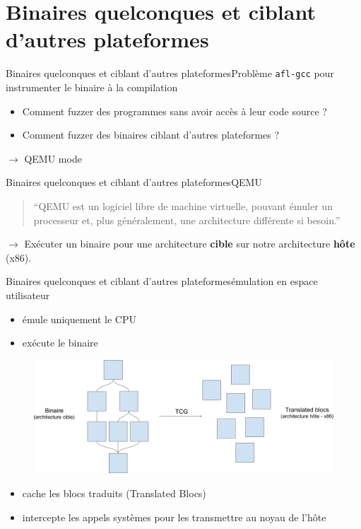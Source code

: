 \section{Binaires quelconques et ciblant d'autres plateformes}

\begin{frame}{Binaires quelconques et ciblant d'autres plateformes}{Problème}
  \lstinline{afl-gcc} pour instrumenter le binaire à la compilation

  \medskip
  \begin{itemize}
  \item Comment fuzzer des programmes sans avoir accès à leur code source ?
  \item Comment fuzzer des binaires ciblant d'autres plateformes ?
  \end{itemize}

  \medskip
  \begin{center}
    {\large$\longrightarrow$ QEMU mode}
  \end{center}
\end{frame}

\begin{frame}{Binaires quelconques et ciblant d'autres plateformes}{QEMU}
  \begin{quote}
  ``QEMU est un logiciel libre de machine virtuelle, pouvant émuler un processeur et, plus généralement, une architecture différente si besoin.''
  \end{quote}

  \medskip
  $\longrightarrow$ Exécuter un binaire pour une architecture \textbf{cible} sur notre architecture \textbf{hôte} (x86).
\end{frame}

\begin{frame}{Binaires quelconques et ciblant d'autres plateformes}{émulation en espace utilisateur}
  \begin{itemize}
  \item émule uniquement le CPU
  \item exécute le binaire
  \end{itemize}

  \begin{figure}
    \includegraphics[width=.9\textwidth,height=.4\textheight]{../medias/qemu.png}
  \end{figure}

  \begin{itemize}
  \item cache les blocs traduits (Translated Blocs)
  \item intercepte les appels systèmes pour les transmettre au noyau de l'hôte
  \end{itemize}
\end{frame}

